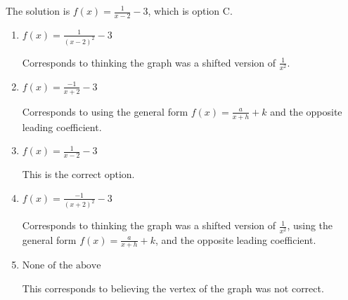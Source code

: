\documentclass{extbook}[14pt]
\begin{document}
\begin{enumerate}
{The solution is \( f(x) = \frac{1}{x - 2} - 3 \), which is option C.\begin{enumerate}[label=\Alph*.]
\item \( f(x) = \frac{1}{(x - 2)^2} - 3 \)

Corresponds to thinking the graph was a shifted version of $\frac{1}{x^2}$.
\item \( f(x) = \frac{-1}{x + 2} - 3 \)

Corresponds to using the general form $f(x) = \frac{a}{x+h}+k$ and the opposite leading coefficient.
\item \( f(x) = \frac{1}{x - 2} - 3 \)

This is the correct option.
\item \( f(x) = \frac{-1}{(x + 2)^2} - 3 \)

Corresponds to thinking the graph was a shifted version of $\frac{1}{x^2}$, using the general form $f(x) = \frac{a}{x+h}+k$, and the opposite leading coefficient.
\item \( \text{None of the above} \)

This corresponds to believing the vertex of the graph was not correct.
\end{enumerate}

}
\end{enumerate}
\end{document}

